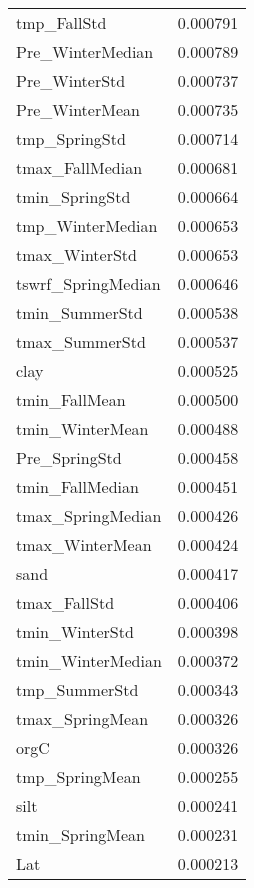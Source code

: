 \begin{tabular}{lr}
tmp_FallStd & 0.000791 \\
Pre_WinterMedian & 0.000789 \\
Pre_WinterStd & 0.000737 \\
Pre_WinterMean & 0.000735 \\
tmp_SpringStd & 0.000714 \\
tmax_FallMedian & 0.000681 \\
tmin_SpringStd & 0.000664 \\
tmp_WinterMedian & 0.000653 \\
tmax_WinterStd & 0.000653 \\
tswrf_SpringMedian & 0.000646 \\
tmin_SummerStd & 0.000538 \\
tmax_SummerStd & 0.000537 \\
clay & 0.000525 \\
tmin_FallMean & 0.000500 \\
tmin_WinterMean & 0.000488 \\
Pre_SpringStd & 0.000458 \\
tmin_FallMedian & 0.000451 \\
tmax_SpringMedian & 0.000426 \\
tmax_WinterMean & 0.000424 \\
sand & 0.000417 \\
tmax_FallStd & 0.000406 \\
tmin_WinterStd & 0.000398 \\
tmin_WinterMedian & 0.000372 \\
tmp_SummerStd & 0.000343 \\
tmax_SpringMean & 0.000326 \\
orgC & 0.000326 \\
tmp_SpringMean & 0.000255 \\
silt & 0.000241 \\
tmin_SpringMean & 0.000231 \\
Lat & 0.000213 \\
\bottomrule
\end{tabular}
